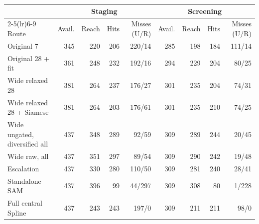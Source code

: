 \begin{tabular}{lrrrrrrrr}
\toprule
 & \multicolumn{4}{c}{Staging} & \multicolumn{4}{c}{Screening} \\
\cmidrule(lr){2-5}\cmidrule(lr){6-9}
Route & Avail. & Reach & Hits & Misses (U/R) & Avail. & Reach & Hits & Misses (U/R) \\
\midrule
Original 7 & 345 & 220 & 206 & 220/14 & 285 & 198 & 184 & 111/14 \\
Original 28 + fit & 361 & 248 & 232 & 192/16 & 294 & 229 & 204 & 80/25 \\
Wide relaxed 28 & 381 & 264 & 237 & 176/27 & 301 & 235 & 204 & 74/31 \\
Wide relaxed 28 + Siamese & 381 & 264 & 203 & 176/61 & 301 & 235 & 210 & 74/25 \\
Wide ungated, diversified all & 437 & 348 & 289 & 92/59 & 309 & 289 & 244 & 20/45 \\
Wide raw, all & 437 & 351 & 297 & 89/54 & 309 & 290 & 242 & 19/48 \\
Escalation & 437 & 330 & 280 & 110/50 & 309 & 281 & 240 & 28/41 \\
Standalone SAM & 437 & 396 & 99 & 44/297 & 309 & 308 & 80 & 1/228 \\
Full central Spline & 437 & 243 & 243 & 197/0 & 309 & 211 & 211 & 98/0 \\
\bottomrule
\end{tabular}
